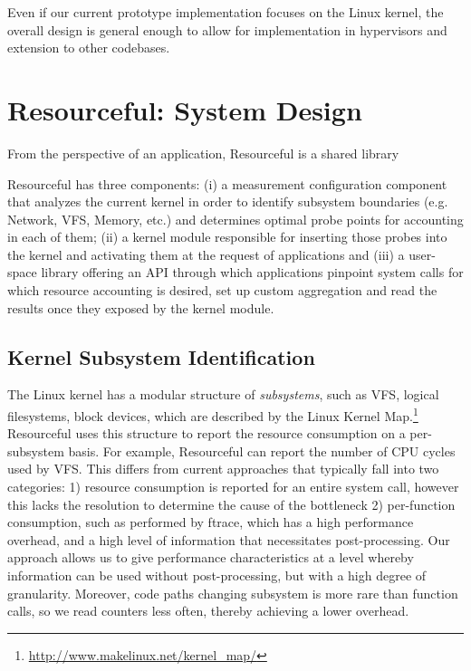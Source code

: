 \documentclass[letterpaper,twocolumn,10pt]{article}
\newcommand{\pname}{Resourceful}
\begin{document}
Even if our current prototype implementation focuses on the Linux kernel, the overall design is general enough to allow for implementation in hypervisors and extension to other codebases.

\section{Resourceful: System Design}
From the perspective of an application, \pname{} is a shared library 

\pname{ } has three components: (i) a measurement configuration component that analyzes the current kernel in order to identify subsystem boundaries (e.g. Network, VFS, Memory, etc.) and determines optimal probe points for accounting in each of them; (ii) a kernel module responsible for inserting those probes into the kernel and activating them at the request of applications and (iii) a user-space library offering an API through which applications pinpoint system calls for which resource accounting is desired, set up custom aggregation and read the results once they exposed by the kernel module. 
\subsection{Kernel Subsystem Identification}

The Linux kernel has a modular structure of \emph{subsystems}, such as VFS, logical filesystems, block devices, which are described by the Linux Kernel Map.\footnote{\url{http://www.makelinux.net/kernel_map/}}
\pname{ } uses this structure to report the resource consumption on a per-subsystem basis.
For example, \pname{ } can report the number of CPU cycles used by VFS.
This differs from current approaches that typically fall into two categories: 1) resource consumption is reported for an entire system call, however this lacks the resolution to determine the cause of the bottleneck 2) per-function consumption, such as performed by ftrace, which has a high performance overhead, and a high level of information that necessitates post-processing.
Our approach allows us to give performance characteristics at a level whereby information can be used without post-processing, but with a high degree of granularity.
Moreover, code paths changing subsystem is more rare than function calls, so we read counters less often, thereby achieving a lower overhead.
\end{document}
